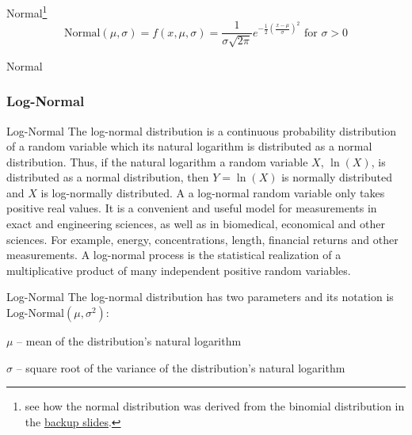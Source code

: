 \begin{frame}[noframenumbering]{Normal\footnote{
			see how the normal distribution was derived from the binomial
			distribution in the \hyperlink{appendixnormal}{backup slides}.}}
	$$\text{Normal}(\mu,\sigma) = f(x, \mu, \sigma) = \frac{1}{\sigma{\sqrt{2\pi }}}e^{-{\frac{1}{2}}\left({\frac {x-\mu }{\sigma }}\right)^{2}} \text{ for $\sigma > 0$}$$
\end{frame}

\begin{frame}[noframenumbering]{Normal}
	\centering
\end{frame}

\subsubsection*{Log-Normal}
\begin{frame}[noframenumbering]{Log-Normal}
	The log-normal distribution is a continuous probability distribution of a
	random variable which its natural logarithm is distributed as a normal distribution.
	Thus, if the natural logarithm a random variable $X$, $\ln(X)$, is distributed
	as a normal distribution, then $Y = \ln(X)$ is normally distributed and
	$X$ is log-normally distributed.
	\vfill
	A a log-normal random variable only takes positive real values.
	It is a convenient and useful model for measurements in exact and engineering
	sciences, as well as in biomedical, economical and other sciences.
	For example, energy, concentrations, length, financial returns and other measurements.
	\vfill
	A log-normal process is the statistical realization of a multiplicative
	product of many independent positive random variables.
\end{frame}

\begin{frame}[noframenumbering]{Log-Normal}
	The log-normal distribution has two parameters and its notation is
	$\text{Log-Normal}(\mu, \sigma^2)$:
	\begin{vfilleditems}
		\item $\mu$ -- mean of the distribution's natural logarithm
		\item $\sigma$ -- square root of the variance of the distribution's natural logarithm
	\end{vfilleditems}
\end{frame}

